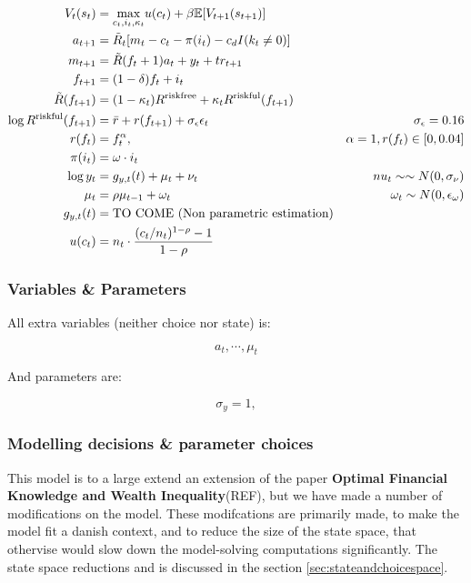 \begin{align}
    V_t(s_t) &= \underset{c_t, i_t, \kappa_t}{\max} u(c_t) + \beta \mathbb{E} [V_{t+1}(s_{t+1})] \\
    a_{t+1} &= \tilde{R}_t [m_t - c_t - \pi(i_t) - c_d I(k_t \neq 0)] \\
    m_{t+1} &= \tilde{R} (f_t + 1) a_t + y_t + tr_{t+1} \\
    f_{t+1} &= (1-\delta)f_t + i_t \\
    \tilde{R}(f_{t+1}) &= (1-\kappa_t) R^{\text{riskfree}} + \kappa_t R^{\text{riskful}}(f_{t+1}) \\
    \log R^{\text{riskful}}(f_{t+1}) &= \bar{r} + r(f_{t+1}) + \sigma_{\epsilon} \epsilon_t & \sigma_\epsilon = 0.16 \\
    r(f_t) &= f_t^{\alpha}, &\alpha = 1, r(f_t)\in [0, 0.04] \\
    \pi(i_t) &= \omega \cdot i_t \\
    \log y_t &= g_{y, t}(t) + \mu_{t} + \nu_{t} &nu_t \sim \sim N(0, \sigma_{\nu}) \\
    \mu_t &= \rho \mu_{t-1} + \omega_t &\omega_t\sim N(0, \epsilon_\omega) \\
    g_{y,t}(t) &= \text{TO COME (Non parametric estimation)}\\
    u (c_t) &= n_t \cdot \frac{(c_t/n_t)^{1-\rho} - 1}{1-\rho} \\
\end{align}

\subsubsection{Variables \& Parameters}

All extra variables (neither choice nor state) is:

\begin{equation}
    a_t, \cdots, \mu_t
\end{equation}

And parameters are:

\begin{equation}
    \sigma_y = 1,
\end{equation}

\subsubsection{Modelling decisions \& parameter choices}

This model is to a large extend an extension of the paper \textbf{Optimal Financial Knowledge and Wealth Inequality}(REF), but we have made a number of modifications on the model. These modifcations are primarily made, to make the model fit a danish context, and to reduce the size of the state space, that othervise would slow down the model-solving computations significantly. The state space reductions and is discussed in the section \ref{sec:stateandchoicespace}.

